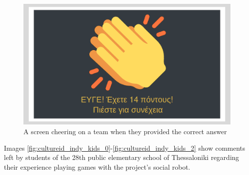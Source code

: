 \begin{figure}[H]\centering
  \includegraphics[scale=0.3]{images/cultureid/sc2.png}
  \caption{\small A screen cheering on a team when they provided the correct
           answer}
  \label{fig:cultureid_sc2}
\end{figure}


Images \ref{fig:cultureid_indy_kids_0}-\ref{fig:cultureid_indy_kids_2} show
comments left by students of the 28th public elementary school of Thessaloniki
regarding their experience playing games with the project's social robot.


